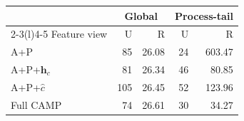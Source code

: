 \begin{tabular}{@{}lrrrr@{}}
\toprule
& \multicolumn{2}{c}{Global} & \multicolumn{2}{c}{Process-tail}\\
\cmidrule(lr){2-3}\cmidrule(l){4-5}
Feature view & U & R & U & R\\
\midrule
A+P & 85 & 26.08 & 24 & 603.47 \\
A+P+$\mathbf{h}_c$ & 81 & 26.34 & 46 & 80.85 \\
A+P+$\hat c$ & 105 & 26.45 & 52 & 123.96 \\
Full CAMP & 74 & 26.61 & 30 & 34.27 \\
\bottomrule
\end{tabular}
